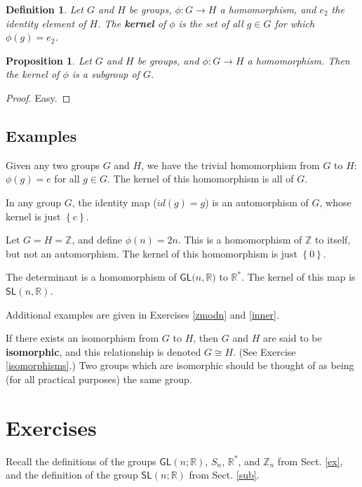 \documentclass[12pt]{amsbook}
\theoremstyle{plain}
\newtheorem{definition}[theorem]{Definition}
\newtheorem{proposition}[theorem]{Proposition}
\numberwithin{equation}{chapter}
\numberwithin{theorem}{chapter}
\begin{document}
\begin{definition}
Let $G$ and $H$ be groups, $\phi:G\rightarrow H$ a homomorphism, and $e_{2}$
the identity element of $H$. The \textbf{kernel} of $\phi$ is the set of all
$g\in G$ for which $\phi(g)=e_{2}$.
\end{definition}

\begin{proposition}
Let $G$ and $H$ be groups, and $\phi:G\rightarrow H$ a homomorphism. Then the
kernel of $\phi$ is a subgroup of $G$.
\end{proposition}

\begin{proof}
Easy.
\end{proof}

\subsection{Examples}

Given any two groups $G$ and $H$, we have the trivial homomorphism from $G$ to
$H$: $\phi(g)=e$ for all $g\in G$. The kernel of this homomorphism is all of
$G$.

In any group $G$, the identity map ($id(g)=g$) is an automorphism of $G$,
whose kernel is just $\left\{  e\right\}  $.

Let $G=H=\mathbb{Z}$, and define $\phi(n)=2n$. This is a homomorphism of
$\mathbb{Z}$ to itself, but not an automorphism. The kernel of this
homomorphism is just $\left\{  0\right\}  $.

The determinant is a homomorphism of $\mathsf{GL}(n,\mathbb{R}\mathbf{)}$ to
$\mathbb{R}^{*}$. The kernel of this map is $\mathsf{SL}\left(  n,\mathbb{R}%
\right)  $.

Additional examples are given in Exercises \ref{zmodn} and \ref{inner}.

If there exists an isomorphism from $G$ to $H$, then $G$ and $H$ are said to
be \textbf{isomorphic}, and this relationship is denoted $G\cong H$. (See
Exercise \ref{isomorphisms}.) Two groups which are isomorphic should be
thought of as being (for all practical purposes) the same group.

\section{Exercises}

Recall the definitions of the groups $\mathsf{GL}(n;\mathbb{R})$, $S_{n}$,
$\mathbb{R}^{*}$, and $\mathbb{Z}_{n}$ from Sect. \ref{ex}, and the definition
of the group $\mathsf{SL}(n;\mathbb{R})$ from Sect. \ref{sub}.
\end{document}
